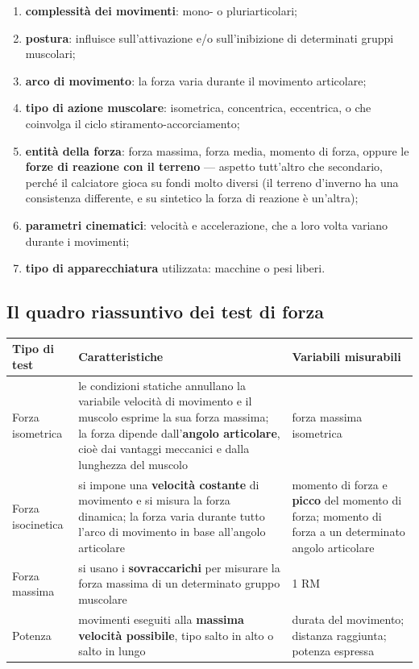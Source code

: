 \begin{enumerate}
  \item \textbf{complessità dei movimenti}: mono- o pluriarticolari;
  \item \textbf{postura}: influisce sull'attivazione e/o sull'inibizione di determinati gruppi
    muscolari;
  \item \textbf{arco di movimento}: la forza varia durante il movimento articolare;
  \item \textbf{tipo di azione muscolare}: isometrica, concentrica, eccentrica, o che coinvolga il
    ciclo stiramento-accorciamento;
  \item \textbf{entità della forza}: forza massima, forza media, momento di forza, oppure le
    \textbf{forze di reazione con il terreno} --- aspetto tutt'altro che secondario, perché il
    calciatore gioca su fondi molto diversi (il terreno d'inverno ha una consistenza differente, e
    su sintetico la forza di reazione è un'altra);
  \item \textbf{parametri cinematici}: velocità e accelerazione, che a loro volta variano durante i
    movimenti;
  \item \textbf{tipo di apparecchiatura} utilizzata: macchine o pesi liberi.
\end{enumerate}

\subsection{Il quadro riassuntivo dei test di forza}

\begin{table}[htbp]
  \centering
  \small
  \renewcommand{\arraystretch}{1.3}
  \begin{tabularx}{\textwidth}{|l|X|X|}
    \hline
    \textbf{Tipo di test} & \textbf{Caratteristiche} & \textbf{Variabili misurabili} \\
    \hline
    Forza isometrica & le condizioni statiche annullano la variabile velocità di movimento e il
      muscolo esprime la sua forza massima; la forza dipende dall'\textbf{angolo articolare}, cioè
      dai vantaggi meccanici e dalla lunghezza del muscolo & forza massima isometrica \\
    \hline
    Forza isocinetica & si impone una \textbf{velocità costante} di movimento e si misura la forza
      dinamica; la forza varia durante tutto l'arco di movimento in base all'angolo articolare &
      momento di forza e \textbf{picco} del momento di forza; momento di forza a un determinato
      angolo articolare \\
    \hline
    Forza massima & si usano i \textbf{sovraccarichi} per misurare la forza massima di un
      determinato gruppo muscolare & 1 RM \\
    \hline
    Potenza & movimenti eseguiti alla \textbf{massima velocità possibile}, tipo salto in alto o
      salto in lungo & durata del movimento; distanza raggiunta; potenza espressa \\
    \hline
  \end{tabularx}
\end{table}

